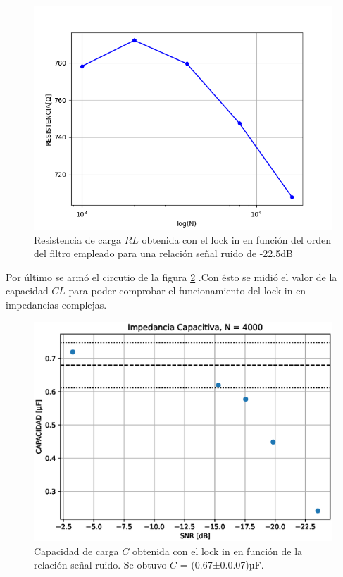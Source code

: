 \documentclass[11pt,a4paper]{extarticle}
\begin{document}
\begin{multicols}{2}
\begin{figure}[H]
	\centering
	\includegraphics[width=\linewidth]{Images/RORDEN.png}
	\caption{Resistencia de carga $RL$ obtenida con 
	el lock in en función
	del orden del filtro empleado para  
	una relación señal ruido de -22.5dB}
	\label{fig:RORDEN}
\end{figure}

Por último se armó el circutio de la figura 
\ref{fig:CvsSNR} .Con ésto 
se midió el valor de la capacidad $CL$ para poder 
comprobar el funcionamiento del lock in en 
impedancias complejas.\\ 

\begin{figure}[H]
	\centering
	\includegraphics[width=\linewidth]{Images/capacitor4000.eps}
	\caption{Capacidad de carga $C$ obtenida con 
	el lock in en función
	de la relación señal ruido. Se obtuvo 
	$C$ = (0.67±0.0.07)µF.}
	\label{fig:CvsSNR}
\end{figure}



\end{multicols}
\end{document}
